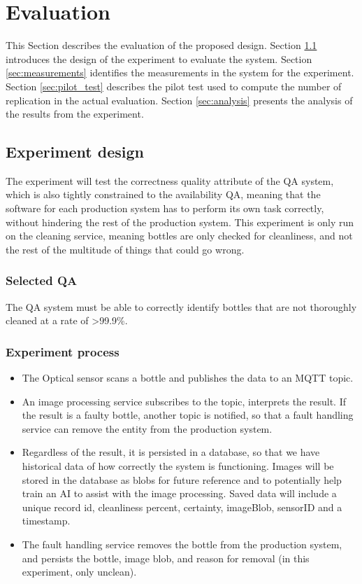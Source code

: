 \section{Evaluation}
\label{sec:evaluation}
This Section describes the evaluation of the proposed design.
Section \ref{sec:design} introduces the design of the experiment to evaluate the system. 
Section \ref{sec:measurements} identifies the measurements in the system for the experiment.
Section \ref{sec:pilot_test} describes the pilot test used to compute the number of replication in the actual evaluation. 
Section \ref{sec:analysis} presents the analysis of the results from the experiment. 

\subsection{Experiment design}
\label{sec:design}
The experiment will test the correctness quality attribute of the QA system, which is also tightly constrained to the availability QA, meaning that the software for each production system has to perform its own task correctly, without hindering the rest of the production system. 
This experiment is only run on the cleaning service, meaning bottles are only checked for cleanliness, and not the rest of the multitude of things that could go wrong.

\subsubsection{Selected QA} 
The QA system must be able to correctly identify bottles that are not thoroughly cleaned at a rate of \textgreater 99.9\%.

\subsubsection{Experiment process}
\begin{itemize}
    \item The Optical sensor scans a bottle and publishes the data to an MQTT topic.
    \item An image processing service subscribes to the topic, interprets the result. If the result is a faulty bottle, another topic is notified, so that a fault handling service can remove the entity from the production system.
    \item Regardless of the result, it is persisted in a database, so that we have historical data of how correctly the system is functioning. Images will be stored in the database as blobs for future reference and to potentially help train an AI to assist with the image processing. Saved data will include a unique record id, cleanliness percent, certainty, imageBlob, sensorID and a timestamp.
    \item The fault handling service removes the bottle from the production system, and persists the bottle, image blob, and reason for removal (in this experiment, only unclean). 
\end{itemize}

